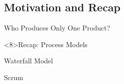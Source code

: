 \subsection{Motivation and Recap}

\begin{frame}{Who Produces Only One Product?}
\end{frame}



\begin{frame}<8>{Recap: Process Models}
	\begin{fancycolumns}
		\begin{exampletight}{Waterfall Model}
			\centering
			\diagramWaterfallModel
		\end{exampletight}
		\nextcolumn
		\begin{exampletight}{Scrum}
			\diagramScrum
		\end{exampletight}
	\end{fancycolumns}
\end{frame}

